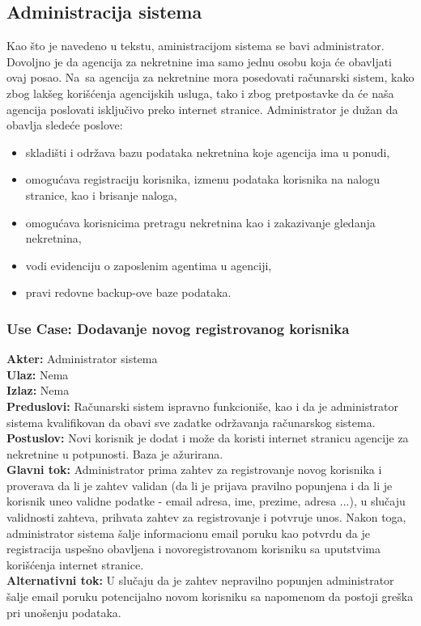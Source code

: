 \documentclass{article}
\begin{document}
\subsection{\bfseries Administracija sistema}
\indent Kao \v {s}to je navedeno u tekstu, aministracijom sistema se bavi administrator. Dovoljno je da agencija za nekretnine ima samo jednu osobu koja \' ce obavljati ovaj posao. Na\ {s}a agencija za nekretnine mora posedovati ra\v {c}unarski sistem, kako zbog lak\v {s}eg kori\v {s}\' cenja agencijskih usluga, tako i zbog pretpostavke da \'ce na\v {s}a agencija poslovati isklju\v {c}ivo preko internet stranice. Administrator je du\v {z}an da obavlja slede\' ce poslove:
\begin{itemize}
    \item skladi\v {s}ti i odr\v {z}ava bazu podataka nekretnina koje agencija ima u ponudi,\\
    \item omogu\' cava registraciju korisnika, izmenu podataka korisnika na nalogu stranice, kao i brisanje naloga,\\
    \item omogu\' cava korisnicima pretragu nekretnina kao i zakazivanje gledanja nekretnina,\\
    \item vodi evidenciju o zaposlenim agentima u agenciji,\\
    \item pravi redovne backup-ove baze podataka.\\
\end{itemize}
\subsubsection{\bfseries Use Case: Dodavanje novog registrovanog korisnika}
{\bfseries Akter:} Administrator sistema\\
{\bfseries Ulaz:} Nema\\
{\bfseries Izlaz:} Nema\\
{\bfseries Preduslovi:} Ra\v {c}unarski sistem ispravno funkcioni\v {s}e, kao i da je administrator sistema kvalifikovan da obavi sve zadatke odr\v {z}avanja ra\v {c}unarskog sistema.\\
{\bfseries Postuslov:} Novi korisnik je dodat i mo\v {z}e da koristi internet stranicu agencije za nekretnine u potpunosti. Baza je a\v {z}urirana.\\
{\bfseries Glavni tok:} Administrator prima zahtev za registrovanje novog korisnika i proverava da li je zahtev validan (da li je prijava pravilno popunjena i da li je korisnik uneo validne podatke - email adresa, ime, prezime, adresa ...), u slu\v {c}aju validnosti zahteva, prihvata zahtev za registrovanje i potvr\dj uje unos. Nakon toga, administrator sistema \v {s}alje informacionu email poruku kao potvrdu da je registracija uspe\v {s}no obavljena i novoregistrovanom korisniku sa uputstvima kori\v {s}\' cenja internet stranice.\\
{\bfseries Alternativni tok:} U slu\v {c}aju da je zahtev nepravilno popunjen administrator \v {s}alje email poruku potencijalno novom korisniku sa napomenom da postoji gre\v {s}ka pri uno\v {s}enju podataka.\\
\end{document}

